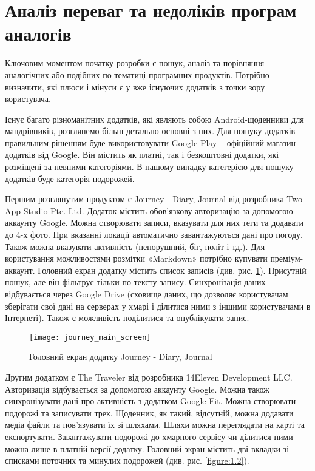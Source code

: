 \documentclass[../main.tex]{subfiles}
\begin{document}
\section{Аналіз переваг та недоліків програм аналогів}

Ключовим моментом початку розробки є пошук, аналіз та порівняння аналогічних або подібних по тематиці програмних продуктів. Потрібно визначити, які плюси і мінуси є у вже існуючих додатків з точки зору користувача.

Існує багато різноманітних додатків, які являють собою Android-щоденники для мандрівників, розглянемо більш детально основні з них. Для пошуку додатків правильним рішенням буде використовувати Google Play -- офіційний магазин додатків від Google. Він містить як платні, так і безкоштовні додатки, які розміщені за певними категоріями. В нашому випадку категерією для пошуку додатків буде категорія подорожей.

Першим розглянутим продуктом є Journey - Diary, Journal від розробника Two App Studio Pte. Ltd. Додаток містить обов'язкову авторизацію за допомогою аккаунту Google. Можна створювати записи, вказувати для них теги та додавати до 4-х фото. При вказанні локації автоматично завантажуються дані про погоду. Також можна вказувати активність (непорушний, біг, політ і тд.). Для користування можливостями розмітки «Markdown» потрібно купувати преміум-аккаунт. Головний екран додатку містить список записів (див. рис. \ref{figure:1.1}). Присутній пошук, але він фільтрує тільки по тексту запису. Синхронізація даних відбувається через Google Drive (сховище даних, що дозволяє користувачам зберігати свої дані на серверах у хмарі і ділитися ними з іншими користувачами в Інтернеті). Також є можливість поділитися та опублікувати запис. 

\begin{figure}[H]
\centering
\texttt{[image: journey\_main\_screen]}
\caption{Головний екран додатку Journey - Diary, Journal}
\label{figure:1.1}
\end{figure}

Другим додатком є The Traveler від розробника 14Eleven Development LLC. Авторизація відбувається за допомогою аккаунту Google. Можна також синхронізувати дані про активність з додатком Google Fit. Можна створювати подорожі та записувати трек. Щоденник, як такий, відсутній, можна додавати медіа файли та пов'язувати їх зі шляхами. Шляхи можна переглядати на карті та експортувати. Завантажувати подорожі до хмарного сервісу чи ділитися ними можна лише в платній версії додатку. Головний экран містить дві вкладки зі списками поточних та минулих подорожей (див. рис. \ref{figure:1.2}). 
\end{document}
